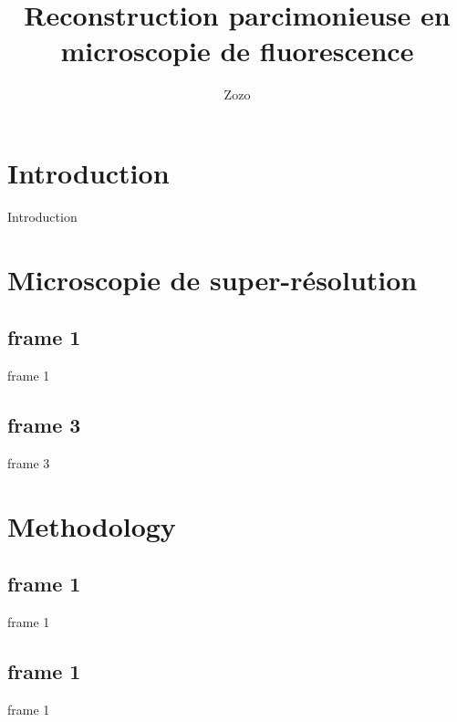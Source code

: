 \documentclass[xcolor=x11names,compress,handout]{beamer}
\begin{document}
    \title[PALM]{Reconstruction parcimonieuse en microscopie de fluorescence}
    \author[]{Zozo}
    \section{Introduction}
    \begin{frame}
    \end{frame}

    \begin{frame}{Introduction}
        \tableofcontents
    \end{frame}

    \section{Microscopie de super-résolution}
    \subsection[OLA]{frame 1}
    \begin{frame}{frame 1}
    \end{frame}

    \begin{frame}
    \end{frame}

    \subsection[OLE]{frame 3}
    \begin{frame}{frame 3}
    \end{frame}

    \section{Methodology}
    \subsection{frame 1}
    \begin{frame}{frame 1}
    \end{frame}

    \subsection{frame 1}
    \begin{frame}{frame 1}
    \end{frame}
\end{document}
